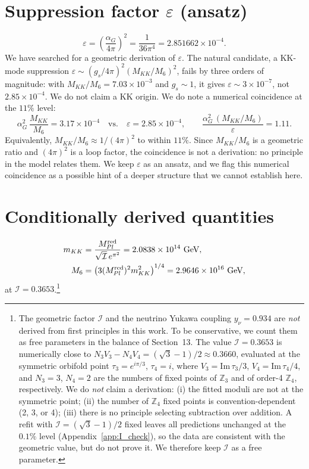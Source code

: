 \documentclass[12pt,a4paper]{article}
\numberwithin{equation}{section}
\begin{document}
\section{Suppression factor \(\varepsilon\) (ansatz)}
\begin{equation}
\varepsilon = \left(\frac{\alpha_G}{4\pi}\right)^2 = \frac{1}{36\pi^4} = 2.851662\times10^{-4}.
\end{equation}
We have searched for a geometric derivation of \(\varepsilon\). The natural candidate, a KK-mode suppression \(\varepsilon \sim (g_s/4\pi)^2 (M_{KK}/M_6)^2\), fails by three orders of magnitude: with \(M_{KK}/M_6 = 7.03\times10^{-3}\) and \(g_s \sim 1\), it gives \(\varepsilon \sim 3\times10^{-7}\), not \(2.85\times10^{-4}\). We do not claim a KK origin. We do note a numerical coincidence at the \(11\%\) level:
\begin{equation}
\alpha_G^2\,\frac{M_{KK}}{M_6} = 3.17\times10^{-4}
\quad\text{vs.}\quad
\varepsilon = 2.85\times10^{-4},
\qquad
\frac{\alpha_G^2\,(M_{KK}/M_6)}{\varepsilon} = 1.11.
\end{equation}
Equivalently, \(M_{KK}/M_6 \approx 1/(4\pi)^2\) to within \(11\%\). Since \(M_{KK}/M_6\) is a geometric ratio and \((4\pi)^2\) is a loop factor, the coincidence is not a derivation: no principle in the model relates them. We keep \(\varepsilon\) as an ansatz, and we flag this numerical coincidence as a possible hint of a deeper structure that we cannot establish here.

\section{Conditionally derived quantities}
\begin{align}
m_{KK} &= \frac{M_{Pl}^{\rm red}}{\sqrt{\mathcal{I}}\,e^{\pi^2}} = 2.0838\times10^{14}~\text{GeV}, \\
M_6 &= \left(3 (M_{Pl}^{\rm red})^2 m_{KK}^2\right)^{1/4} = 2.9646\times10^{16}~\text{GeV},
\end{align}
at \(\mathcal{I} = 0.3653\).\footnote{The geometric factor \(\mathcal{I}\) and the neutrino Yukawa coupling \(y_\nu = 0.934\) are \emph{not} derived from first principles in this work. To be conservative, we count them as free parameters in the balance of Section~13. The value \(\mathcal{I} = 0.3653\) is numerically close to \(N_3 V_3 - N_4 V_4 = (\sqrt{3}-1)/2 \approx 0.3660\), evaluated at the symmetric orbifold point \(\tau_3 = e^{i\pi/3}\), \(\tau_4 = i\), where \(V_3 = \mathrm{Im}\,\tau_3/3\), \(V_4 = \mathrm{Im}\,\tau_4/4\), and \(N_3=3\), \(N_4=2\) are the numbers of fixed points of \(\mathbb Z_3\) and of order-4 \(\mathbb Z_4\), respectively. We do \emph{not} claim a derivation: (i) the fitted moduli are not at the symmetric point; (ii) the number of \(\mathbb Z_4\) fixed points is convention-dependent (2, 3, or 4); (iii) there is no principle selecting subtraction over addition. A refit with \(\mathcal I = (\sqrt{3}-1)/2\) fixed leaves all predictions unchanged at the \(0.1\%\) level (Appendix~\ref{app:I_check}), so the data are consistent with the geometric value, but do not prove it. We therefore keep \(\mathcal I\) as a free parameter.}
\end{document}
